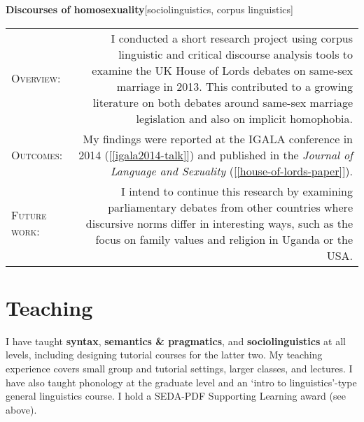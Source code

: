 \documentclass[11pt,a4paper,twoside]{article}
\makeatletter
\newlength{\rulelength}%
\newcommand{\REx}[2]{%
\vspace*{0.1\baselineskip}%
{\large\textbf{#1}\hfill\textnormal{[#2]}}%
\vspace*{0.5\baselineskip}%
}
\newenvironment{cvsection}{%
  \setlength{\extrarowheight}{0.70ex}
  \begin{longtable}[l]{@{} L R @{}}
}{%
  \end{longtable}
}
\newcommand{\sref}[1]{[\ref{#1}]}
\newcommand{\subhead}[1]{%
\textsc{#1}:%
}
\makeatother
\begin{document}
\REx{Discourses of homosexuality}{sociolinguistics, corpus linguistics}
\begin{cvsection}
  \subhead{Overview} &%
  I conducted a short research project using corpus linguistic and critical discourse analysis tools to examine the UK House of Lords debates on same-sex marriage in 2013. This contributed to a growing literature on both debates around same-sex marriage legislation and also on implicit homophobia.%
\\
  \subhead{Outcomes} &%
  My findings were reported at the IGALA conference in 2014 (\sref{igala2014-talk}) and published in the \textit{Journal of Language and Sexuality} (\sref{house-of-lords-paper}).%
\\
  \subhead{Future work} &%
  I intend to continue this research by examining parliamentary debates from other countries where discursive norms differ in interesting ways, such as the focus on family values and religion in Uganda or the USA.
\end{cvsection}


\newpage

\section*{Teaching}

I have taught \textbf{syntax}, \textbf{semantics \& pragmatics}, and \textbf{sociolinguistics} at all levels, including designing tutorial courses for the latter two. My teaching experience covers small group and tutorial settings, larger classes, and lectures. I have also taught phonology at the graduate level and an `intro to linguistics'-type general linguistics course. I hold a SEDA-PDF Supporting Learning award (see above).
\end{document}

